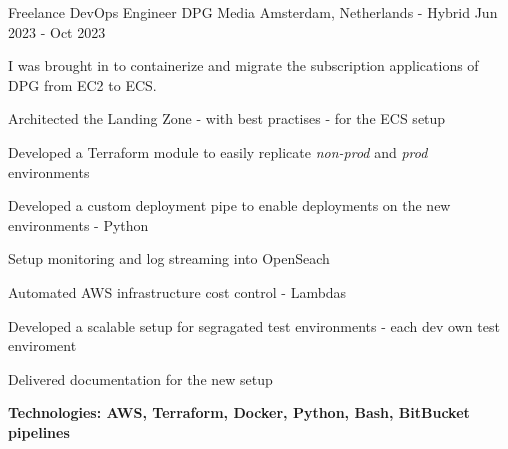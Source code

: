 


\begin{cventries}

\cventry
{Freelance DevOps Engineer} %
{DPG Media} %
{Amsterdam, Netherlands - Hybrid} %
{Jun 2023 - Oct 2023} %
{ %
I was brought in to containerize and migrate the subscription applications of DPG from EC2 to ECS.
\newline \hfill
	\begin{cvitems}
		\item {Architected the Landing Zone - with best practises - for the ECS setup}
		\item {Developed a Terraform module to easily replicate \emph{non-prod} and \emph{prod} environments}
		\item {Developed a custom deployment pipe to enable deployments on the new environments - Python}
		\item {Setup monitoring and log streaming into OpenSeach}
		\item {Automated AWS infrastructure cost control - Lambdas}
		\item {Developed a scalable setup for segragated test environments - each dev own test enviroment}
		\item {Delivered documentation for the new setup}
		\item {\bfseries{Technologies:} AWS, Terraform, Docker, Python, Bash, BitBucket pipelines}
	\end{cvitems}
}


\end{cventries}
